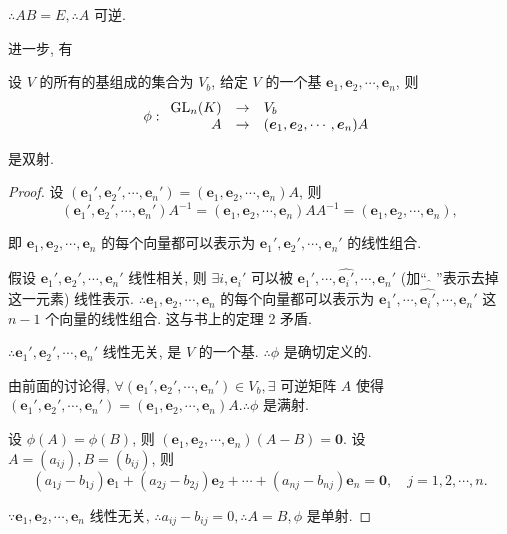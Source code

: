 \documentclass{ctexart}
\begin{document}
$\therefore AB=E,\therefore A$ 可逆.

进一步, 有
\begin{theorem}\label{t1.1}
    设 $V$ 的所有的基组成的集合为 $V_b$, 给定 $V$ 的一个基 $\boldsymbol{e}_1,\boldsymbol{e}_2,\cdots,\boldsymbol{e}_n$, 则
    \[\phi:\begin{array}{rcl}
        \operatorname{GL} _n(K) & \to & V_b \\
        A & \to & (\boldsymbol{e}_1,\boldsymbol{e}_2,\cdots,\boldsymbol{e}_n)A \\
    \end{array}\]

    是双射.
\end{theorem}
\begin{proof}
    设 $(\boldsymbol{e}_1',\boldsymbol{e}_2',\cdots,\boldsymbol{e}_n')=(\boldsymbol{e}_1,\boldsymbol{e}_2,\cdots,\boldsymbol{e}_n)A$, 则
    \[(\boldsymbol{e}_1',\boldsymbol{e}_2',\cdots,\boldsymbol{e}_n')A^{-1}=(\boldsymbol{e}_1,\boldsymbol{e}_2,\cdots,\boldsymbol{e}_n)AA^{-1}=(\boldsymbol{e}_1,\boldsymbol{e}_2,\cdots,\boldsymbol{e}_n),\]

    即 $\boldsymbol{e}_1,\boldsymbol{e}_2,\cdots,\boldsymbol{e}_n$ 的每个向量都可以表示为 $\boldsymbol{e}_1',\boldsymbol{e}_2',\cdots,\boldsymbol{e}_n'$ 的线性组合.

    假设 $\boldsymbol{e}_1',\boldsymbol{e}_2',\cdots,\boldsymbol{e}_n'$ 线性相关, 则 $\exists i,\boldsymbol{e}_i'$ 可以被 $\boldsymbol{e}_1',\cdots,\widehat{\boldsymbol{e}_i'},\cdots,\boldsymbol{e}_n'$ (加`` $\hat{}$ ''表示去掉这一元素) 线性表示. $\therefore\boldsymbol{e}_1,\boldsymbol{e}_2,\cdots,\boldsymbol{e}_n$ 的每个向量都可以表示为 $\boldsymbol{e}_1',\cdots,\widehat{\boldsymbol{e}_i'},\cdots,\boldsymbol{e}_n'$ 这 $n-1$ 个向量的线性组合. 这与书上的定理 2 矛盾.

    $\therefore\boldsymbol{e}_1',\boldsymbol{e}_2',\cdots,\boldsymbol{e}_n'$ 线性无关, 是 $V$ 的一个基. $\therefore\phi$ 是确切定义的.

    由前面的讨论得, $\forall(\boldsymbol{e}_1',\boldsymbol{e}_2',\cdots,\boldsymbol{e}_n')\in V_b,\exists$ 可逆矩阵 $A$ 使得 $(\boldsymbol{e}_1',\boldsymbol{e}_2',\cdots,\boldsymbol{e}_n')=(\boldsymbol{e}_1,\boldsymbol{e}_2,\cdots,\boldsymbol{e}_n)A.\therefore\phi$ 是满射.

    设 $\phi(A)=\phi(B)$, 则 $(\boldsymbol{e}_1,\boldsymbol{e}_2,\cdots,\boldsymbol{e}_n)(A-B)=\boldsymbol{0}$. 设 $A=(a_{ij}),B=(b_{ij})$, 则
    \[(a_{1j}-b_{1j})\boldsymbol{e}_1+(a_{2j}-b_{2j})\boldsymbol{e}_2+\cdots+(a_{nj}-b_{nj})\boldsymbol{e}_n=\boldsymbol{0},\quad j=1,2,\cdots,n.\]

    $\because\boldsymbol{e}_1,\boldsymbol{e}_2,\cdots,\boldsymbol{e}_n$ 线性无关, $\therefore a_{ij}-b_{ij}=0,\therefore A=B,\phi$ 是单射.
\end{proof}
\end{document}
